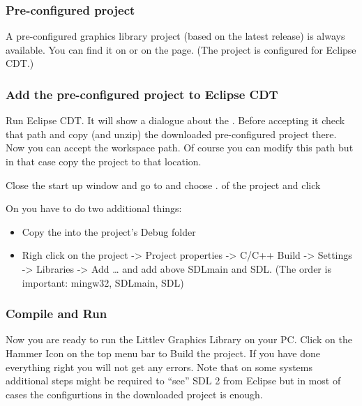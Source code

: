 \documentclass[letterpaper,10pt,english]{sphinxmanual}
\begin{document}
\subsubsection{Pre-configured project}
\label{\detokenize{get-started/pc-simulator:pre-configured-project}}
A pre-configured graphics library project (based on the latest release) is always available.
You can find it on  or on the  page.
(The project is configured for Eclipse CDT.)


\subsubsection{Add the pre-configured project to Eclipse CDT}
\label{\detokenize{get-started/pc-simulator:add-the-pre-configured-project-to-eclipse-cdt}}
Run Eclipse CDT. It will show a dialogue about the . Before accepting it check that path and copy (and unzip) the downloaded pre-configured project there. Now you can accept the workspace path. Of course you can modify this path but in that case copy the project to that location.

Close the start up window and go to  and choose .  of the project and click 

On  you have to do two additional things:
\begin{itemize}
\item {} 
Copy the  into the project’s Debug folder

\item {} 
Righ click on the project -\textgreater{} Project properties -\textgreater{} C/C++ Build -\textgreater{} Settings -\textgreater{} Libraries -\textgreater{} Add … and add  above SDLmain and SDL. (The order is important: mingw32, SDLmain, SDL)

\end{itemize}


\subsubsection{Compile and Run}
\label{\detokenize{get-started/pc-simulator:compile-and-run}}
Now you are ready to run the Littlev Graphics Library on your PC. Click on the Hammer Icon on the top menu bar to Build the project. If you have done everything right you will not get any errors. Note that on some systems additional steps might be required to “see” SDL 2 from Eclipse but in most of cases the configurtions in the downloaded project is enough.
\end{document}
